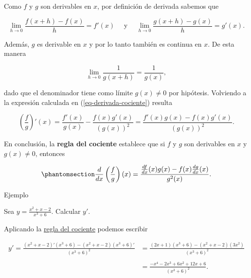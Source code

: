 \documentclass[
  letterpaper,
]{book}
\theoremstyle{plain}
\theoremstyle{remark}
\begin{document}
Como \(f\) y \(g\) son derivables en \(x\), por definición de derivada
sabemos que

\[
\lim_{h\to 0}\frac{f(x+h)-f(x)}{h}=f'(x)\quad\text{ y }\quad \lim_{h\to 0}\frac{g(x+h)-g(x)}{h}=g'(x).
\]

Además, \(g\) es derivable en \(x\) y por lo tanto también es continua
en \(x\). De esta manera

\[
\lim_{h\to 0}\frac{1}{g(x+h)}=\frac{1}{g(x)},
\]

dado que el denominador tiene como límite \(g(x)\neq 0\) por hipótesis.
Volviendo a la expresión calculada en (\ref{eq-derivada-cociente})
resulta

\[
\left(\frac{f}{g}\right)'(x)=\frac{f'(x)}{g(x)}-\frac{f(x)g'(x)}{(g(x))^2}=\frac{f'(x)g(x)-f(x)g'(x)}{(g(x))^2}.
\]

En conclusión, la \textbf{regla del cociente} establece que si \(f\) y
\(g\) son derivables en \(x\) y \(g(x)\neq 0\), entonces

\begin{equation}\phantomsection\label{eq-regla-cociente}{
\frac{d}{dx}\left(\frac{f}{g}\right)(x)=\frac{\frac{df}{dx}(x)g(x)-f(x)\frac{dg}{dx}(x)}{g^2(x)}.
}\end{equation}

Ejemplo

Sea \(\displaystyle y=\frac{x^2+x-2}{x^3+6}\). Calcular \(y'\).

\begin{tcolorbox}[enhanced jigsaw, opacityback=0, left=2mm, opacitybacktitle=0.6, toprule=.15mm, bottomrule=.15mm, colbacktitle=quarto-callout-tip-color!10!white, titlerule=0mm, bottomtitle=1mm, title=\textcolor{quarto-callout-tip-color}{\faLightbulb}\hspace{0.5em}{Solución}, toptitle=1mm, colframe=quarto-callout-tip-color-frame, colback=white, breakable, rightrule=.15mm, arc=.35mm, leftrule=.75mm, coltitle=black]

Aplicando la \hyperref[eq-regla-cociente]{regla del cociente} podemos
escribir

\[
\begin{aligned}
y'=\frac{(x^2+x-2)'(x^3+6)-(x^2+x-2)(x^3+6)'}{(x^3+6)^2}&=\frac{(2x+1)(x^3+6)-(x^2+x-2)(3x^2)}{(x^3+6)^2}\\
\\
&=\frac{-x^4-2x^3+6x^2+12x+6}{(x^3+6)^2}.
\end{aligned}
\]

\end{tcolorbox}
\end{document}
